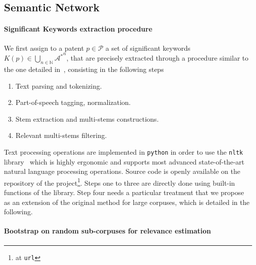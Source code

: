 \subsection{Semantic Network}

\paragraph{Significant Keywords extraction procedure}

We first assign to a patent $p \in \mathcal{P}$ a set of significant keywords $K(p)\in \bigcup_{n\in \mathbb{N}} {\mathcal{A}^{\ast}}^n$, that are precisely extracted through a procedure similar to the one detailed in~\cite{chavalarias2013phylomemetic}, consisting in the following steps
\begin{enumerate}
\item Text parsing and tokenizing.
\item Part-of-speech tagging, normalization.
\item Stem extraction and multi-stems constructions.
\item Relevant multi-stems filtering.
\end{enumerate}

Text processing operations are implemented in \texttt{python} in order to use the \texttt{nltk} library~\cite{bird2006nltk} which is highly ergonomic and supports most advanced state-of-the-art natural language processing operations. Source code is openly available on the repository of the project\footnote{at \texttt{url}}.
Steps one to three are directly done using built-in functions of the library. Step four needs a particular treatment that we propose as an extension of the original method for large corpuses, which is detailed in the following.

\paragraph{Bootstrap on random sub-corpuses for relevance estimation}

